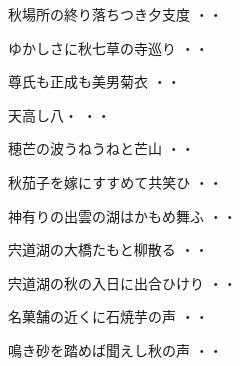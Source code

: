 \vspace{0.6cm}
\begin{shiika}秋場所の終り落ちつき夕支度
\hfill{・・}\end{shiika}
\vspace{0.6cm}
\begin{shiika}ゆかしさに秋七草の寺巡り
\hfill{・・}\end{shiika}
\vspace{0.6cm}
\begin{shiika}尊氏も正成も美男菊衣
\hfill{・・}\end{shiika}
\vspace{0.6cm}
\begin{shiika}天高し八・
\hfill{・・}\end{shiika}
\vspace{0.6cm}
\begin{shiika}穂芒の波うねうねと芒山
\hfill{・・}\end{shiika}
\vspace{0.6cm}
\begin{shiika}秋茄子を嫁にすすめて共笑ひ
\hfill{・・}\end{shiika}
\vspace{0.6cm}
\begin{shiika}神有りの出雲の湖はかもめ舞ふ
\hfill{・・}\end{shiika}
\vspace{0.6cm}
\begin{shiika}宍道湖の大橋たもと柳散る
\hfill{・・}\end{shiika}
\vspace{0.6cm}
\begin{shiika}宍道湖の秋の入日に出合ひけり
\hfill{・・}\end{shiika}
\vspace{0.6cm}
\begin{shiika}名菓舗の近くに石焼芋の声
\hfill{・・}\end{shiika}
\vspace{0.6cm}
\begin{shiika}鳴き砂を踏めば聞えし秋の声
\hfill{・・}\end{shiika}
\vspace{0.6cm}
